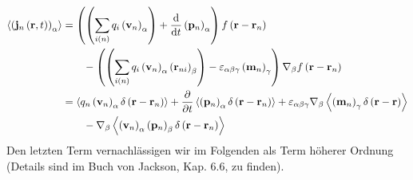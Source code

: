 \begin{align*}
	\left\langle \left(\mathbf{j}_{n}\left(\mathbf{r},t\right)\right)_{\alpha }\right\rangle & =\left(\left(\sum _{i\left(n\right)}q_{i}\left(\mathbf{v}_{n}\right)_{\alpha }\right)+\frac{\mathop{}\!\mathrm{d} }{\mathop{}\!\mathrm{d} t}\left(\mathbf{p}_{n}\right)_{\alpha }\right)f\left(\mathbf{r}-\mathbf{r}_{n}\right)                                                                                                                                                                                                                 \\
	                                                                                     & \qquad-\left(\left(\sum _{i\left(n\right)}q_{i}\left(\mathbf{v}_{n}\right)_{\alpha }\left(\mathbf{r}_{ni}\right)_{\beta }\right)-\varepsilon _{\alpha \beta \gamma }\left(\mathbf{m}_{n}\right)_{\gamma }\right)\nabla _{\beta }f\left(\mathbf{r}-\mathbf{r}_{n}\right)                                                                                                                                           \\
	                                                                                     & =\left\langle q_{n}\left(\mathbf{v}_{n}\right)_{\alpha }\delta \left(\mathbf{r}-\mathbf{r}_{n}\right)\right\rangle +\frac{\partial }{\partial t}\left\langle \left(\mathbf{p}_{n}\right)_{\alpha }\delta \left(\mathbf{r}-\mathbf{r}_{n}\right)\right\rangle +\varepsilon _{\alpha \beta \gamma }\nabla _{\beta }\left\langle \left(\mathbf{m}_{n}\right)_{\gamma }\delta \left(\mathbf{r}-\mathbf{r}\right)\right\rangle \\
	                                                                                     & \qquad -\nabla _{\beta }\left\langle \left(\mathbf{v}_{n}\right)_{\alpha }\left(\mathbf{p}_{n}\right)_{\beta }\delta \left(\mathbf{r}-\mathbf{r}_{n}\right)\right\rangle
\end{align*}
Den letzten Term vernachlässigen wir im Folgenden als Term höherer Ordnung (Details sind im Buch von Jackson, Kap. 6.6, zu finden).

